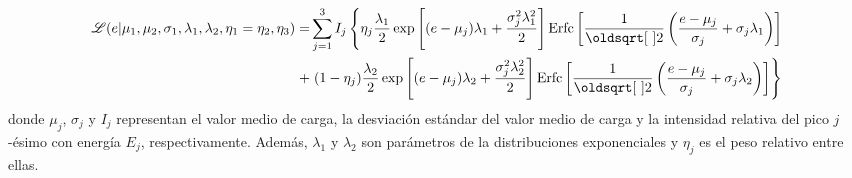 {\small
\begin{align}
    \Lagr(e|\mu_{1},
            \mu_{2},
            \sigma_{1},
            \lambda_{1},
            \lambda_{2},
            \eta_{1} = \eta_{2},
            \eta_{3})
    = &
    \sum\limits_{j=1}^{3} I_{j}
    \left\{
        \eta_{j}\frac{\lambda_{1}}{2}
        \exp
            \left[
                (e-\mu_{j})\lambda_{1} + \frac{\sigma_{j}^{2}\lambda_{1}^{2}}{2}
            \right]
        \mbox{Erfc}
        \left[
            \frac{1}{\sqrt{2}}
            \left(
                \frac{e - \mu_{j}}{\sigma_{j}}
                +\sigma_{j}\lambda_{1}
            \right)
        \right] \right. \nonumber
        \\
        + &
        \left.
        (1-\eta_{j})\frac{\lambda_{2}}{2}
        \exp
            \left[
                 (e - \mu_{j})\lambda_{2}
                 + \frac{\sigma_{j}^{2}\lambda_{2}^{2}}{2}
            \right]
        \mbox{Erfc}
        \left[
            \frac{1}{\sqrt{2}}
            \left(
                \frac{e - \mu_{j}}{\sigma_{j}}
                +\sigma_{j}\lambda_{2}
            \right)
        \right]
    \right\}
        \label{ec:verosimilitud}
\end{align}
}%
donde $\mu_{j}$, $\sigma_{j}$ y $I_{j}$ representan el valor medio de carga, la desviación estándar del valor medio de carga y la intensidad relativa del pico $j$-ésimo con energía $E_{j}$, respectivamente. Además, $\lambda_{1}$ y $\lambda_{2}$ son parámetros de la distribuciones exponenciales y $\eta_{j}$ es el peso relativo entre ellas.

